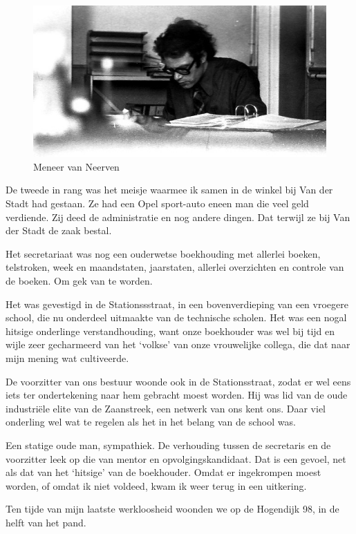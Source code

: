 \documentclass[10pt,twoside, openright]{memoir}
\begin{document}
\begin{figure}
\includegraphics[width=\textwidth]{img/ch41/IMG_0002}
\caption*{\footnotesize Meneer van Neerven}
\end{figure}

De tweede in rang was het meisje waarmee ik samen in de winkel bij Van der Stadt had gestaan. Ze had een Opel sport-auto eneen man die veel geld verdiende. Zij deed de administratie en nog andere dingen. Dat terwijl ze bij Van der Stadt de zaak bestal.

Het secretariaat was nog een ouderwetse boekhouding met allerlei boeken, telstroken, week en maandstaten, jaarstaten, allerlei overzichten en controle van de boeken. Om gek van te worden. 

Het was gevestigd in de Stationssstraat, in een bovenverdieping van een vroegere school, die nu onderdeel uitmaakte van de technische scholen. Het was een nogal hitsige onderlinge verstandhouding, want onze boekhouder was wel bij tijd en wijle zeer gecharmeerd van het `volkse' van onze vrouwelijke collega, die dat naar mijn mening wat cultiveerde. 

De voorzitter van ons bestuur woonde ook in de Stationsstraat, zodat er wel eens iets ter ondertekening naar hem gebracht moest worden. Hij was lid van de oude industriële elite van de Zaanstreek, een netwerk van ons kent ons. Daar viel onderling wel wat te regelen als het in het belang van de school was. 

Een statige oude man, sympathiek. De verhouding tussen de secretaris en de voorzitter leek op die van mentor en opvolgingskandidaat. Dat is een gevoel, net als dat van het `hitsige' van de boekhouder. Omdat er ingekrompen moest worden, of omdat ik niet voldeed, kwam ik weer terug in een uitkering.

Ten tijde van mijn laatste werkloosheid woonden we op de Hogendijk 98, in de helft van het pand.
\end{document}

